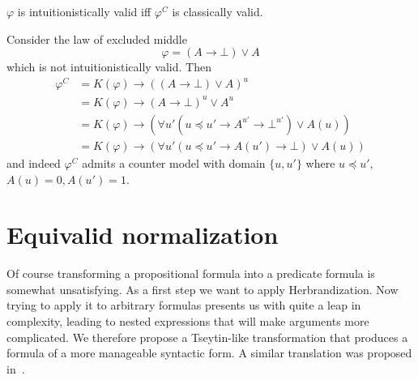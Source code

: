 \documentclass[a4paper,UKenglish,cleveref, autoref, thm-restate]{lipics-v2021}
\begin{document}
\begin{lemma}
	$\varphi$ is intuitionistically valid iff $\varphi^C$ is classically valid.
\end{lemma}

\begin{example}
	Consider the law of excluded middle $$\varphi = (A\to \bot)\vee A$$ which is not intuitionistically valid. Then
	\begin{align*}
		\varphi^{C} &= K(\varphi)\to ((A\to \bot)\vee A)^u\\
		&= K(\varphi)\to (A\to \bot)^u\vee A^u\\
		&= K(\varphi)\to (\forall u'( u\preceq u' \to A^{u'}\to \bot^{u'})\vee A(u))\\
		&= K(\varphi)\to (\forall u' (u\preceq u' \to A(u')\to \bot)\vee A(u))
	\end{align*}
	and indeed $\varphi^{C}$ admits a counter model with domain $\{u, u'\}$ where $u \preceq u'$, $A(u) = 0, A(u') = 1$.
\end{example}


\section{Equivalid normalization}

Of course transforming a propositional formula into a predicate formula is somewhat unsatisfying. As a first step we want to apply Herbrandization. Now trying to apply it to arbitrary formulas presents us with quite a leap in complexity, leading to nested expressions that will make arguments more complicated. We therefore propose a Tseytin-like transformation that produces a formula of a more manageable syntactic form. A similar translation was proposed in~\cite{statman1979intuitionistic}.
\end{document}
